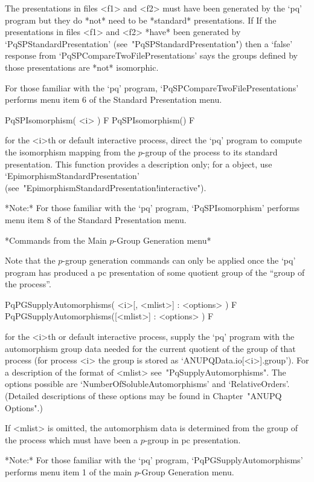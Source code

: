 The presentations in files <f1> and  <f2> must have been generated by the
`pq' program but they do *not* need to be *standard* presentations. If If
the  presentations  in files  <f1>  and  <f2>  *have* been  generated  by
`PqSPStandardPresentation'    (see~"PqSPStandardPresentation")   then   a
`false' response  from `PqSPCompareTwoFilePresentations' says  the groups
defined by those presentations are *not* isomorphic.

For      those      familiar      with       the       `pq'       program,
`PqSPCompareTwoFilePresentations' performs menu item 6  of  the  Standard
Presentation menu.

\>PqSPIsomorphism( <i> ) F
\>PqSPIsomorphism() F

for the <i>th or default interactive {\ANUPQ} process,  direct  the  `pq'
program to compute the isomorphism mapping  from  the  $p$-group  of  the
process  to  its  standard  presentation.  This   function   provides   a
description      only;      for      a      {\GAP}      object,       use
`EpimorphismStandardPresentation'
(see~"EpimorphismStandardPresentation!interactive").

*Note:* For  those  familiar  with  the  `pq'  program,  `PqSPIsomorphism'
performs menu item 8 of the Standard Presentation menu.

*Commands from the Main $p$-Group Generation menu*

Note that the $p$-group generation commands can only be applied once  the
`pq' program has produced a pc presentation of some quotient group of the
``group of the process''.

\>PqPGSupplyAutomorphisms( <i>[, <mlist>] : <options> ) F
\>PqPGSupplyAutomorphisms([<mlist>] : <options> ) F

for the  <i>th or default  interactive {\ANUPQ} process, supply  the `pq'
program with the automorphism group  data needed for the current quotient
of the  group of  that process (for  process <i>  the group is  stored as
`ANUPQData.io[<i>].group').  For  a description of the  format of <mlist>
see~"PqSupplyAutomorphisms".      The      options      possible      are
`NumberOfSolubleAutomorphisms'    and     `RelativeOrders'.     (Detailed
descriptions of these options may be found in Chapter~"ANUPQ Options".)

If <mlist> is omitted, the automorphism data is determined from the group
of  the process  which must  have been  a $p$-group  in  pc presentation.

*Note:*
For  those  familiar  with  the  `pq'  program,  `PqPGSupplyAutomorphisms'
performs menu item 1 of the main $p$-Group Generation menu.

